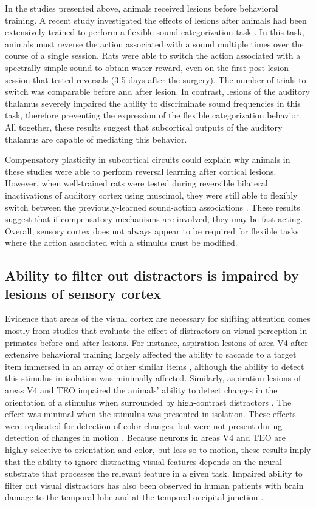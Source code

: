 In the studies presented above, animals received lesions before behavioral training. A recent study investigated the effects of lesions after animals had been extensively trained to perform a flexible sound categorization task \citep{Gimenez2015}. In this task, animals must reverse the action associated with a sound multiple times over the course of a single session.
%
Rats were able to switch the action associated with a spectrally-simple sound to obtain water reward, even on the first post-lesion session that tested reversals (3-5 days after the surgery). The number of trials to switch was comparable before and after lesion. 
%
In contrast, lesions of the auditory thalamus severely impaired the ability to discriminate sound frequencies in this task, therefore preventing the expression of the flexible categorization behavior. All together, these results suggest that subcortical outputs of the auditory thalamus are capable of mediating this behavior.

Compensatory plasticity in subcortical circuits could explain why animals in these studies were able to perform reversal learning after cortical lesions.
%
However, when well-trained rats were tested during reversible bilateral inactivations of auditory cortex using muscimol, they were still able to flexibly switch between the previously-learned sound-action associations \citep{Gimenez2015}. These results suggest that if compensatory mechanisms are involved, they may be fast-acting. 
%
Overall, sensory cortex does not always appear to be required for flexible tasks where the action associated with a stimulus must be modified.
\subsection{Ability to filter out distractors is impaired by lesions of sensory cortex}  

Evidence that areas of the visual cortex are necessary for shifting attention comes mostly from studies that evaluate the effect of distractors on visual perception in primates before and after lesions. For instance, aspiration lesions of area V4 after extensive behavioral training largely affected the ability to saccade to a target item immersed in an array of other similar items \citep{Schiller1991}, although the ability to detect this stimulus in isolation was minimally affected. Similarly, aspiration lesions of areas V4 and TEO impaired the animals' ability to detect changes in the orientation of a stimulus when surrounded by high-contrast distractors \citep{DeWeerd1999}. The effect was minimal when the stimulus was presented in isolation. These effects were replicated for detection of color changes, but were not present during detection of changes in motion \citep{DeWeerd2003}. Because neurons in areas V4 and TEO are highly selective to orientation and color, but less so to motion, these results imply that the ability to ignore distracting visual features depends on the neural substrate that processes the relevant feature in a given task. 
Impaired ability to filter out visual distractors has also been observed in human patients with brain damage to the temporal lobe \citep{Mendola1999} and at the temporal-occipital junction \citep{Gallant2000}.

